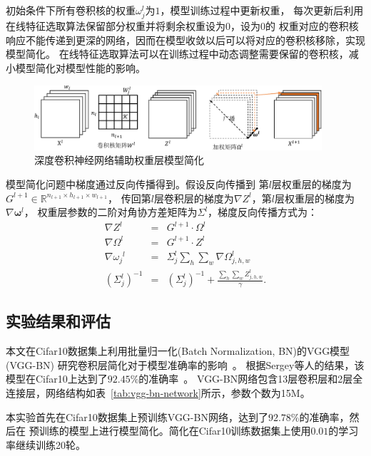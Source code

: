 \documentclass[doctor]{ustcthesis}
\def \R {\mathbb{R}}
\begin{document}
初始条件下所有卷积核的权重$\omega_j^l$为$1$，模型训练过程中更新权重，
每次更新后利用在线特征选取算法保留部分权重并将剩余权重设为$0$，设为$0$的
权重对应的卷积核响应不能传递到更深的网络，因而在模型收敛以后可以将对应的卷积核移除，实现模型简化。
在线特征选取算法可以在训练过程中动态调整需要保留的卷积核，减小模型简化对模型性能的影响。

\begin{figure}[t]
    \centering
    \includegraphics[clip=true, width=0.95\textwidth]{simplify-w.pdf}
    \caption{深度卷积神经网络辅助权重层模型简化}
    \label{fig:cnn-simplify-w}
    \vspace{-2em}
\end{figure}

模型简化问题中梯度通过反向传播得到。假设反向传播到
第$l$层权重层的梯度为$G^{l+1} \in \R^{n_{l+1} \times h_{l+1} \times w_{l+1}}$，
传回第$l$层卷积层的梯度为$\nabla Z^l$，第$l$层权重层的梯度为$\nabla\bm{\omega}^l$，
权重层参数的二阶对角协方差矩阵为$\Sigma^l$，梯度反向传播方式为：
\begin{eqnarray}
    \nabla Z^l &=& G^{l+1} \cdot \Omega^l \\
    \nabla \Omega^l &=& G^{l+1} \cdot Z^l \\
    \nabla{\omega_j}^l &=& \Sigma^l_j\sum_h\sum_w\nabla \Omega^l_{j,h,w} \\
    (\Sigma^l_j)^{-1} &=& (\Sigma^l_j)^{-1}  + \frac{\sum_h\sum_w Z^l_{j,h,w}}{\gamma}.
\end{eqnarray}

\subsection{实验结果和评估}
本文在Cifar10数据集上利用批量归一化(Batch Normalization, BN)的VGG模型(VGG-BN)
研究卷积层简化对于模型准确率的影响~\cite{vggbncifar}。
根据Sergey等人的结果，该模型在Cifar10上达到了$92.45\%$的准确率~\cite{vggbncifar}。
VGG-BN网络包含13层卷积层和2层全连接层，网络结构如表~\ref{tab:vgg-bn-network}所示，参数个数为15M。

本实验首先在Cifar10数据集上预训练VGG-BN网络，达到了$92.78\%$的准确率，然后在
预训练的模型上进行模型简化。简化在Cifar10训练数据集上使用$0.01$的学习率继续训练20轮。
\end{document}
